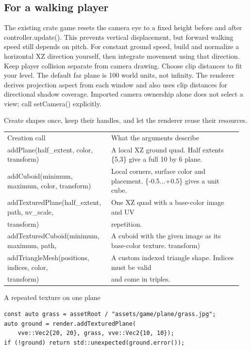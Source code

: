 \documentclass[11pt,a4paper]{article}
\begin{document}
\subsection*{For a walking player}
The existing crate game resets the camera eye to a fixed height before and after controller.update(). This prevents vertical displacement, but forward walking speed still depends on pitch. For constant ground speed, build and normalize a horizontal XZ direction yourself, then integrate movement using that direction. Keep player collision separate from camera drawing. Choose clip distances to fit your level. The default far plane is 100 world units, not infinity. The renderer derives projection aspect from each window and also uses clip distances for directional shadow coverage. Imported camera ownership alone does not select a view; call setCamera() explicitly.

\label{core-60}
Create shapes once, keep their handles, and let the renderer reuse their resources.

{\small
\begin{longtable}{@{}p{0.42\linewidth}p{0.54\linewidth}@{}}
Creation call & What the arguments describe \\
addPlane(half\_extent, color, transform) & A local XZ ground quad. Half extents \{5,3\} give a full 10 by 6 plane. \\
addCuboid(minimum, maximum, color, transform) & Local corners, surface color and placement. \{-0.5...+0.5\} gives a unit cube. \\
addTexturedPlane(half\_extent, path, uv\_scale, & One XZ quad with a base-color image and UV \\
transform) & repetition. \\
addTexturedCuboid(minimum, maximum, path, & A cuboid with the given image as its base-color texture. transform) \\
addTriangleMesh(positions, indices, color, & A custom indexed triangle shape. Indices must be valid \\
transform) & and come in triples. \\
\end{longtable}
}

A repeated texture on one plane

\begin{lstlisting}[language={}]
const auto grass = assetRoot / "assets/game/plane/grass.jpg";
auto ground = render.addTexturedPlane(
    vve::Vec2{20, 20}, grass, vve::Vec2{10, 10});
if (!ground) return std::unexpected(ground.error());
\end{lstlisting}
\end{document}
